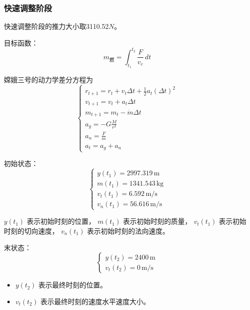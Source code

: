 \documentclass{ctexart}
\begin{document}
\subsubsection{快速调整阶段}
快速调整阶段的推力大小取3110.52\(N\)。

目标函数：
\begin{equation}
m_{\text{燃}} = \int_{t_1}^{t_2} \frac{F}{v_e} \, dt
\end{equation}

嫦娥三号的动力学差分方程为
\[
\begin{cases}
r_{t+1} = r_t + v_t \Delta t + \frac{1}{2} a_t (\Delta t)^2 \\
v_{t+1} = v_t + a_t \Delta t \\
m_{t+1} = m_t - \dot{m} \Delta t \\
a_g = - G \frac{M}{r^2} \\
a_n = \frac{F}{m} \\
a_t = a_g + a_n
\end{cases}
\]

初始状态：
\begin{equation}
\begin{cases}
y(t_1) = 2997.319 \, \text{m} \\
m(t_1) = 1341.543 \, \text{kg} \\
v_t(t_1) = 6.592 \, \text{m/s} \\
v_n(t_1) = 56.616 \, \text{m/s}
\end{cases}
\end{equation}


$y(t_1)$ 表示初始时刻的位置，
$m(t_1)$ 表示初始时刻的质量，
$v_t(t_1)$ 表示初始时刻的切向速度，
$v_n(t_1)$ 表示初始时刻的法向速度。

末状态：
\begin{equation}
\begin{cases}
y(t_2) = 2400 \, \text{m} \\
{v_t(t_2)} = 0 \, \text{m/s}
\end{cases}
\end{equation}

\begin{itemize}
    \renewcommand\labelitemi{} %
\item $y(t_2)$ 表示最终时刻的位置。
\item ${v_t(t_2)}$ 表示最终时刻的速度水平速度大小。
\end{itemize}
\end{document}
